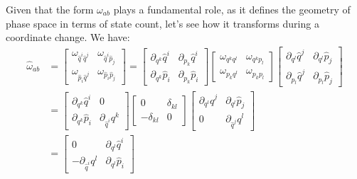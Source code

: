 
Given that the form $\omega_{ab}$ plays a fundamental role, as it defines the geometry of phase space in terms of state count, let's see how it transforms during a coordinate change. We have:
\begin{equation}
	\begin{aligned}
		\hat{\omega}_{ab} &=\left[\begin{array}{cc}
			\omega_{\hat{q}^i \hat{q}^j} & \omega_{\hat{q}^i \hat{p}_j} \\
			\omega_{\hat{p}_i \hat{q}^j} & \omega_{\hat{p}_i \hat{p}_j} 
		\end{array} \right] = \left[\begin{array}{cc}
			\partial_{q^k} \hat{q}^i & \partial_{p_k} \hat{q}^i \\
			\partial_{q^k} \hat{p}_i & \partial_{p_k} \hat{p}_i 
		\end{array} \right]
		\left[\begin{array}{cc}
			\omega_{q^k q^l} & \omega_{q^k p_l} \\
			\omega_{p_k q^l} & \omega_{p_k p_l} 
		\end{array} \right]
		\left[\begin{array}{cc}
			\partial_{q^l} \hat{q}^j & \partial_{q^l} \hat{p}_j \\
			\partial_{p_l} \hat{q}^j & \partial_{p_l} \hat{p}_j 
		\end{array} \right]\\
		&= \left[\begin{array}{cc}
			\partial_{q^k} \hat{q}^i & 0 \\
			\partial_{q^k} \hat{p}_i & \partial_{\hat{q}^i} q^k 
		\end{array} \right]
		\left[\begin{array}{cc}
			0 & \delta_{kl} \\
			- \delta_{kl} & 0 
		\end{array} \right]
		\left[\begin{array}{cc}
			\partial_{q^l} \hat{q}^j & \partial_{q^l} \hat{p}_j \\
			0 & \partial_{\hat{q}^j} q^l 
		\end{array} \right] \\
		&= \left[\begin{array}{cc}
			0 & \partial_{q^l} \hat{q}^i \\
			- \partial_{\hat{q}^i} q^l  & \partial_{q^l} \hat{p}_i 
		\end{array} \right]

\end{aligned}
\end{equation}
